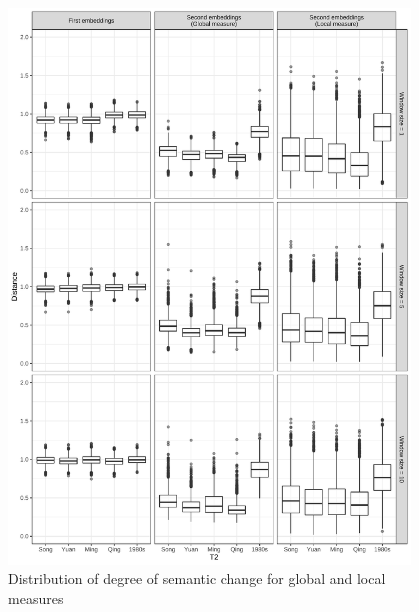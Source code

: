\newpage
\begin{figure}[H]
    \centering
    \includegraphics[width=0.95\textwidth,height=0.95\textheight,keepaspectratio]{figures_new/measures/dist_boxplot.pdf}
    \caption{Distribution of degree of semantic change for global and local measures}
\end{figure}

